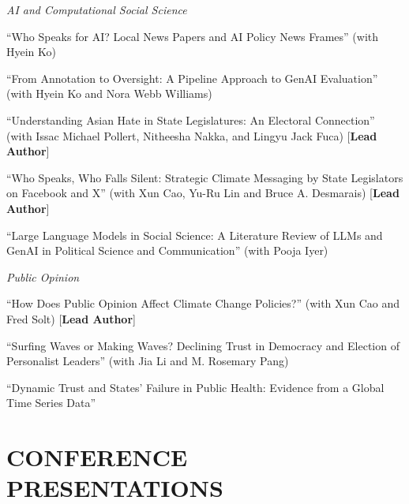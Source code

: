 \documentclass[10.5pt,]{article}
\providecommand{\tightlist}{%
	\setlength{\itemsep}{0pt}\setlength{\parskip}{0pt}}
\renewenvironment{itemize}{
	\begin{list}{}{
			\setlength{\leftmargin}{1.5em}
		}
	}{
	\end{list}
}
\begin{document}
\begin{itemize}
  \begin{itemize}
  \tightlist
  \item
    \emph{AI and Computational Social Science}
  \item
    ``Who Speaks for AI? Local News Papers and AI Policy News Frames''
    (with Hyein Ko)
  \item
    ``From Annotation to Oversight: A Pipeline Approach to GenAI
    Evaluation'' (with Hyein Ko and Nora Webb Williams)
  \item
    ``Understanding Asian Hate in State Legislatures: An Electoral
    Connection'' (with Issac Michael Pollert, Nitheesha Nakka, and
    Lingyu Jack Fuca) {[}\textbf{Lead Author}{]}
  \item
    ``Who Speaks, Who Falls Silent: Strategic Climate Messaging by State
    Legislators on Facebook and X'' (with Xun Cao, Yu-Ru Lin and Bruce
    A. Desmarais) {[}\textbf{Lead Author}{]}
  \item
    ``Large Language Models in Social Science: A Literature Review of
    LLMs and GenAI in Political Science and Communication'' (with Pooja
    Iyer)
  \item
    \emph{Public Opinion}
  \item
    ``How Does Public Opinion Affect Climate Change Policies?'' (with
    Xun Cao and Fred Solt) {[}\textbf{Lead Author}{]}
  \item
    ``Surfing Waves or Making Waves? Declining Trust in Democracy and
    Election of Personalist Leaders'' (with Jia Li and M. Rosemary Pang)
  \item
    ``Dynamic Trust and States' Failure in Public Health: Evidence from
    a Global Time Series Data''
  \end{itemize}
\end{itemize}

\section{CONFERENCE PRESENTATIONS}\label{conference-presentations}
\end{document}
